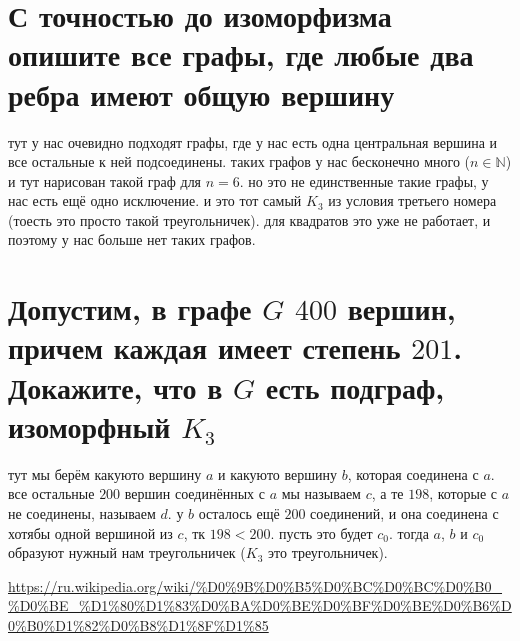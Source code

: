 \documentclass{article}
\newcommand{\N}{\mathbb{N}}
\begin{document}
  \section{С точностью до изоморфизма опишите все графы, где любые два ребра имеют общую вершину}
  \begin{wrapfigure}{r}{6cm}
    \vspace{-1cm}
    \hfill
    \vspace{-.5cm}
  \end{wrapfigure}
  тут у нас очевидно подходят графы, где у нас есть одна центральная вершина и все остальные к ней подсоединены.
  таких графов у нас бесконечно много ($n \in \N$) и тут нарисован такой граф для $n=6$.
  но это не единственные такие графы, у нас есть ещё одно исключение.
  и это тот самый $K_3$ из условия третьего номера (тоесть это просто такой треугольничек).
  для квадратов это уже не работает, и поэтому у нас больше нет таких графов.


  \section{Допустим, в графе $G$ $400$ вершин, причем каждая имеет степень $201$. Докажите, что в $G$ есть подграф, изоморфный $K_3$}
  \begin{wrapfigure}{r}{3cm}
    \vspace{-1cm}
    \hfill
    \vspace{-1cm}
  \end{wrapfigure}
  тут мы берём какуюто вершину $a$ и какуюто вершину $b$, которая соединена с $a$.
  все остальные $200$ вершин соединённых с $a$ мы называем $c$,
  а те $198$, которые с $a$ не соединены, называем $d$.
  у $b$ осталось ещё $200$ соединений, и она соединена с хотябы одной вершиной из $c$, тк $198 < 200$.
  пусть это будет $c_0$.
  тогда $a$, $b$ и $c_0$ образуют нужный нам треугольничек ($K_3$ это треугольничек).

  \vfill
  \begin{thebibliography}{9}
     \url{https://ru.wikipedia.org/wiki/%D0%9B%D0%B5%D0%BC%D0%BC%D0%B0_%D0%BE_%D1%80%D1%83%D0%BA%D0%BE%D0%BF%D0%BE%D0%B6%D0%B0%D1%82%D0%B8%D1%8F%D1%85}
  \end{thebibliography}
\end{document}
